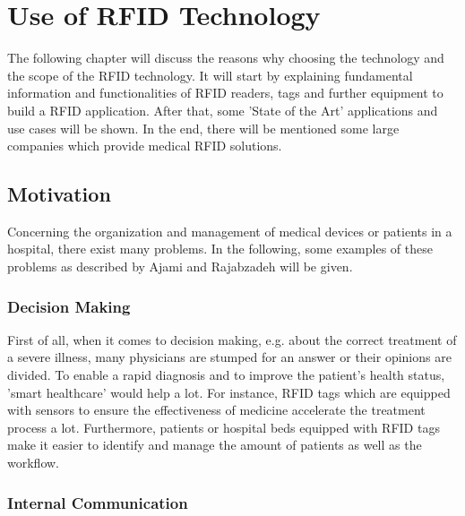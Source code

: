 \chapter{Use of RFID Technology}
\label{Kap1}

The following chapter will discuss the reasons why choosing the technology and the scope of the RFID technology. It will start by explaining fundamental information and functionalities of RFID readers, tags and further equipment to build a RFID application. After that, some 'State of the Art' applications and use cases will be shown. In the end, there will be mentioned some large companies which provide medical RFID solutions.

\section{Motivation}

Concerning the organization and management of medical devices or patients in a hospital, there exist many problems. In the following, some examples of these problems as described by Ajami and Rajabzadeh \cite{ncbi} will be given.

\subsection{Decision Making}

First of all, when it comes to decision making, e.g. about the correct treatment of a severe illness, many physicians are stumped for an answer or their opinions are divided. To enable a rapid diagnosis and to improve the patient's health status, 'smart healthcare' \cite{henrici} would help a lot. For instance, RFID tags which are equipped with sensors to ensure the effectiveness of medicine accelerate the treatment process a lot. Furthermore, patients or hospital beds equipped with RFID tags make it easier to identify and manage the amount of patients as well as the workflow.

\subsection{Internal Communication}

